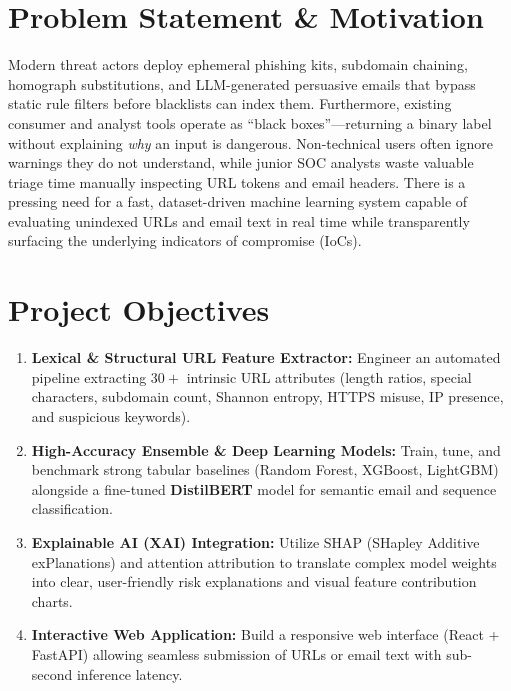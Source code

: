 \documentclass[10pt, a4paper]{article}
\begin{document}
\section{Problem Statement \& Motivation}
Modern threat actors deploy ephemeral phishing kits, subdomain chaining, homograph substitutions, and LLM-generated persuasive emails that bypass static rule filters before blacklists can index them. Furthermore, existing consumer and analyst tools operate as ``black boxes''—returning a binary label without explaining \textit{why} an input is dangerous. Non-technical users often ignore warnings they do not understand, while junior SOC analysts waste valuable triage time manually inspecting URL tokens and email headers. There is a pressing need for a fast, dataset-driven machine learning system capable of evaluating unindexed URLs and email text in real time while transparently surfacing the underlying indicators of compromise (IoCs).

\section{Project Objectives}
\begin{enumerate}
    \item \textbf{Lexical \& Structural URL Feature Extractor:} Engineer an automated pipeline extracting $30+$ intrinsic URL attributes (length ratios, special characters, subdomain count, Shannon entropy, HTTPS misuse, IP presence, and suspicious keywords).
    \item \textbf{High-Accuracy Ensemble \& Deep Learning Models:} Train, tune, and benchmark strong tabular baselines (Random Forest, XGBoost, LightGBM) alongside a fine-tuned \textbf{DistilBERT} model for semantic email and sequence classification.
    \item \textbf{Explainable AI (XAI) Integration:} Utilize SHAP (SHapley Additive exPlanations) and attention attribution to translate complex model weights into clear, user-friendly risk explanations and visual feature contribution charts.
    \item \textbf{Interactive Web Application:} Build a responsive web interface (React + FastAPI) allowing seamless submission of URLs or email text with sub-second inference latency.
\end{enumerate}

\end{document}
